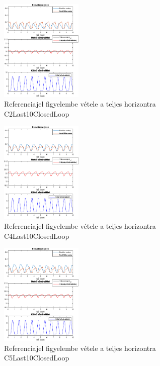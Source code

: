 \begin{figure}[H]
\centering
\includegraphics[width=0.35\textwidth, trim=0 0 0 0, clip,]{figures/onlab/NoSlope/C2Last10ClosedLoop}
\caption{Referenciajel figyelembe vétele a teljes horizontra C2Last10ClosedLoop}
\label{fig:onlab-refprev3}
\end{figure}

\begin{figure}[H]
\centering
\includegraphics[width=0.35\textwidth, trim=0 0 0 0, clip,]{figures/onlab/NoSlope/C4Last10ClosedLoop}
\caption{Referenciajel figyelembe vétele a teljes horizontra C4Last10ClosedLoop}
\label{fig:onlab-refprev4}
\end{figure}

\begin{figure}[H]
\centering
\includegraphics[width=0.35\textwidth, trim=0 0 0 0, clip,]{figures/onlab/NoSlope/C5Last10ClosedLoop}
\caption{Referenciajel figyelembe vétele a teljes horizontra C5Last10ClosedLoop}
\label{fig:onlab-refprev5}
\end{figure}

